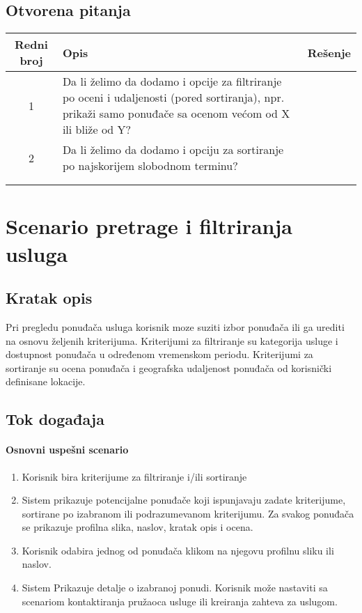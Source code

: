 \documentclass[a4paper,12pt]{report}
\newcommand{\genitivfunkcionalnosti}{pretrage i filtriranja usluga}
\begin{document}
		\subsection{Otvorena pitanja}
			\begin{tabular}{ |c|p{10cm}|l| }
				\hline
				\textbf{Redni broj} & \textbf{Opis} & \textbf{Rešenje} \\ 
				\hline
			    1 & Da li želimo da dodamo i opcije za filtriranje po oceni i udaljenosti (pored sortiranja), npr. prikaži samo ponuđače sa ocenom većom od X ili bliže od Y? &  \\
				\hline
			    2 & Da li želimo da dodamo i opciju za sortiranje po najskorijem slobodnom terminu?  & \\
				\hline
				&  & \\
				\hline
				&  & \\
				\hline
			\end{tabular}
	\section{Scenario \genitivfunkcionalnosti}
		\subsection{Kratak opis}
			Pri pregledu ponuđača usluga korisnik moze suziti izbor ponuđača ili ga urediti na osnovu željenih kriterijuma.
			Kriterijumi za filtriranje su kategorija usluge i dostupnost ponuđača u određenom vremenskom periodu.
			Kriterijumi za sortiranje su ocena ponuđača i geografska udaljenost ponuđača od korisnički definisane lokacije.
		\newpage
		\subsection{Tok događaja}
			\paragraph*{Osnovni uspešni scenario}
				\begin{enumerate}
					\item Korisnik bira kriterijume za filtriranje i/ili sortiranje
					\item Sistem prikazuje potencijalne ponuđače koji ispunjavaju zadate kriterijume, sortirane po izabranom ili podrazumevanom kriterijumu. Za svakog ponuđača se prikazuje profilna slika, naslov, kratak opis i ocena.
					\item Korisnik odabira jednog od ponuđača klikom na njegovu profilnu sliku ili naslov.
					\item Sistem Prikazuje detalje o izabranoj ponudi. Korisnik može nastaviti sa scenariom kontaktiranja pružaoca usluge ili kreiranja zahteva za uslugom.
				\end{enumerate}
\end{document}
